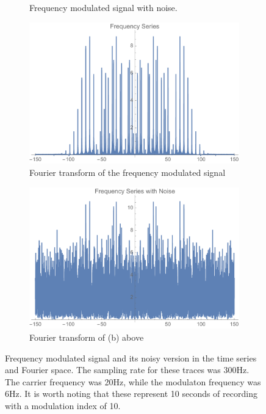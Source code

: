 \documentclass[onecolumn, groupedaddress, 10pt]{revtex4-1}
\begin{document}
\begin{figure}[H]
\begin{subfigure}{.5\textwidth}
  		\caption{\label{fig:results2}Frequency modulated signal with noise.}
	\end{subfigure}
	\begin{subfigure}{.5\textwidth}
  		\centering
  		\includegraphics[width=.9\linewidth]{fourierSeries.pdf}
  		\caption{\label{fig:results3} Fourier transform of the frequency modulated signal}
	\end{subfigure}%
	\begin{subfigure}{.5\textwidth}
  		\centering
  		\includegraphics[width=.9\linewidth]{fourierSeriesNoise.pdf}
  		\caption{\label{fig:results4} Fourier transform of (b) above}
	\end{subfigure}
	\caption{\label{fig:} Frequency modulated signal and its noisy version in the time series and Fourier space.  The sampling rate for these traces was 300Hz. The carrier frequency was 20Hz, while the modulaton frequency was 6Hz. It is worth noting that these represent 10 seconds of recording with a modulation index of 10.}
\end{figure}	
\end{document}
